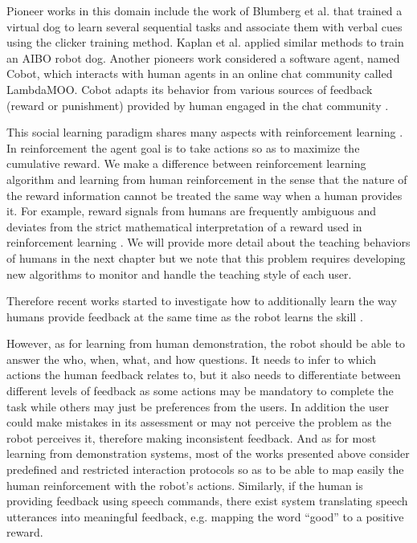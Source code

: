 Pioneer works in this domain include the work of Blumberg et al. \cite{blumberg2002integrated} that trained a virtual dog to learn several sequential tasks and associate them with verbal cues using the clicker training method. Kaplan et al. \cite{kaplan2002robotic} applied similar methods to train an AIBO robot dog. Another pioneers work considered a software agent, named Cobot, which interacts with human agents in an online chat community called LambdaMOO. Cobot adapts its behavior from various sources of feedback (reward or punishment) provided by human engaged in the chat community \cite{isbell2001social}.

This social learning paradigm shares many aspects with reinforcement learning \cite{sutton1998reinforcement}. In reinforcement the agent goal is to take actions so as to maximize the cumulative reward. We make a difference between reinforcement learning algorithm and learning from human reinforcement in the sense that the nature of the reward information cannot be treated the same way when a human provides it. For example, reward signals from humans are frequently ambiguous and deviates from the strict mathematical interpretation of a reward used in reinforcement learning \cite{thomaz2008teachable,Cakmak2010optimality}. We will provide more detail about the teaching behaviors of humans in the next chapter but we note that this problem requires developing new algorithms to monitor and handle the teaching style of each user.

Therefore recent works started to investigate how to additionally learn the way humans provide feedback at the same time as the robot learns the skill \cite{knox2009interactively}. 

However, as for learning from human demonstration, the robot should be able to answer the who, when, what, and how questions. It needs to infer to which actions the human feedback relates to, but it also needs to differentiate between different levels of feedback as some actions may be mandatory to complete the task while others may just be preferences from the users. In addition the user could make mistakes in its assessment or may not perceive the problem as the robot perceives it, therefore making inconsistent feedback. And as for most learning from demonstration systems, most of the works presented above consider predefined and restricted interaction protocols so as to be able to map easily the human reinforcement with the robot's actions. Similarly, if the human is providing feedback using speech commands, there exist system translating speech utterances into meaningful feedback, e.g. mapping the word ``good'' to a positive reward.

